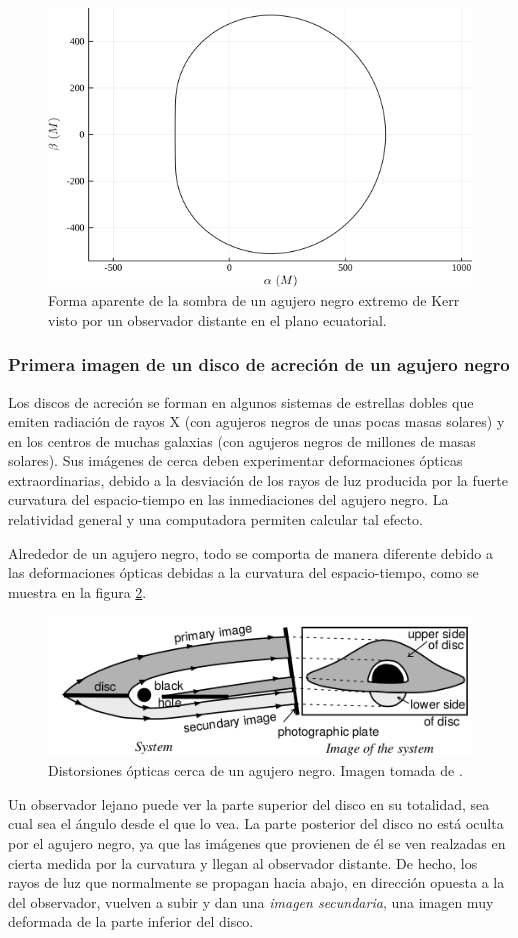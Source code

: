 \documentclass[11pt]{article}
\begin{document}
\begin{figure}[H]
\centering
\includegraphics[width=0.5\linewidth]{Images/kerr_shadow.png}
\caption{Forma aparente de la sombra de un agujero negro extremo de Kerr visto por un observador distante en el plano ecuatorial.}
\label{fig:sombra_kerr}
\end{figure}

\subsubsection{Primera imagen de un disco de acreción de un agujero negro}

Los discos de acreción se forman en algunos sistemas de estrellas dobles que emiten radiación de rayos X (con agujeros negros de unas pocas masas solares) y en los centros de muchas galaxias (con agujeros negros de millones de masas solares). Sus imágenes de cerca deben experimentar deformaciones ópticas extraordinarias, debido a la desviación de los rayos de luz producida por la fuerte curvatura del espacio-tiempo en las inmediaciones del agujero negro. La relatividad general y una computadora permiten calcular tal efecto. \medskip

Alrededor de un agujero negro, todo se comporta de manera diferente debido a las deformaciones ópticas debidas a la curvatura del espacio-tiempo, como se muestra en la figura \ref{fig:acrecion_schwarzschild}.

\begin{figure}[H]
\centering
\includegraphics[width=0.5\linewidth]{Images/black_hole_distortions.png}
\caption{Distorsiones ópticas cerca de un agujero negro. Imagen tomada de \cite{Luminet_1992}.}
\label{fig:acrecion_schwarzschild}
\end{figure}

Un observador lejano puede ver la parte superior del disco en su totalidad, sea cual sea el ángulo desde el que lo vea. La parte posterior del disco no está oculta por el agujero negro, ya que las imágenes que provienen de él se ven realzadas en cierta medida por la curvatura y llegan al observador distante. De hecho, los rayos de luz que normalmente se propagan hacia abajo, en dirección opuesta a la del observador, vuelven a subir y dan una \emph{imagen secundaria}, una imagen muy deformada de la parte inferior del disco. \medskip
\end{document}
